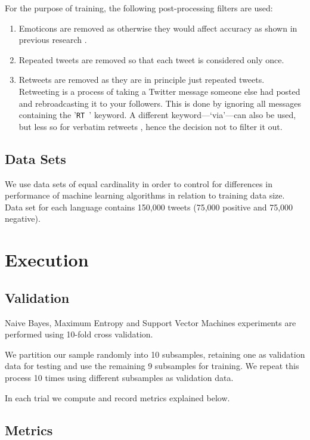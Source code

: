 For the purpose of training, the following post-processing filters are used:

\begin{enumerate}
  \item Emoticons are removed as otherwise they would affect accuracy as shown in previous research \cite{TwitterDistantSupervision09}.
  \item Repeated tweets are removed so that each tweet is considered only once.
  \item Retweets are removed as they are in principle just repeated tweets. Retweeting is a process of taking a Twitter message someone else had posted and rebroadcasting it to your followers. This is done by ignoring all messages containing the '\verb|RT |' keyword. A different keyword---`via'---can also be used, but less so for verbatim retweets \cite{Retweets}, hence the decision not to filter it out.
\end{enumerate}

\subsection{Data Sets}

We use data sets of equal cardinality in order to control for differences in performance of machine learning algorithms in relation to training data size. Data set for each language contains 150,000 tweets (75,000 positive and 75,000 negative).

\section{Execution}

\subsection{Validation}

Naive Bayes, Maximum Entropy and Support Vector Machines experiments are performed using 10-fold cross validation.

We partition our sample randomly into 10 subsamples, retaining one as validation data for testing and use the remaining 9 subsamples for training. We repeat this process 10 times using different subsamples as validation data.

In each trial we compute and record metrics explained below.

\subsection{Metrics}

